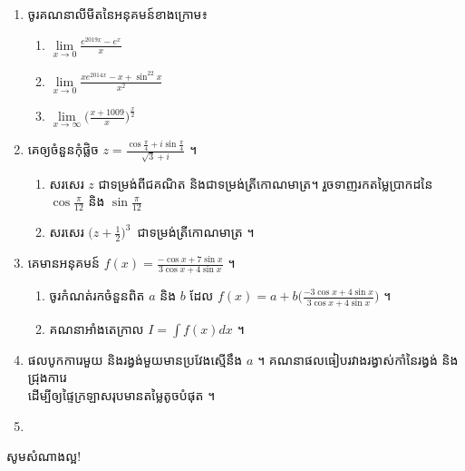 \documentclass[a4paper, 12pt]{exam}
\begin{document}
	\begin{enumerate}[I]
		\item ចូរគណនាលីមីតនៃអនុគមន៍ខាងក្រោម៖
		\begin{multicols}{3}
			\begin{enumerate}[a]
				\item $\lim\limits_{x\to 0}\frac{e^{2019x}-e^x}{x}$
				\item $\lim\limits_{x\to 0}\frac{xe^{2014x}-x+\sin^22x}{x^2}$
				\item $\lim\limits_{x\to\infty}\bigg(\frac{x+1009}{x}\bigg)^\frac{x}{2}$
			\end{enumerate}
		\end{multicols}
		\item គេឲ្យចំនួនកុំផ្លិច $z=\frac{\cos\frac{\pi}{4}+i\sin\frac{\pi}{4}}{\sqrt{3}+i}$ ។
		\begin{enumerate}[1]
			\item សរសេរ $z$ ជាទម្រង់ពីជគណិត និងជាទម្រង់ត្រីកោណមាត្រ។ រួចទាញរកតម្លៃប្រាកដនៃ $\cos\frac{\pi}{12}$ និង $\sin\frac{\pi}{12}$
			\item សរសេរ $\bigg(z+\frac{1}{2}\bigg)^3$~ជាទម្រង់ត្រីកោណមាត្រ ។
		\end{enumerate}
		\item គេមានអនុគមន៍ $f(x)=\frac{-\cos x+7\sin x}{3\cos x+4\sin x}$ ។
		\begin{enumerate}[1]
			\item ចូរកំណត់រកចំនួនពិត $a$ និង $b$ ដែល $f(x)=a+b\bigg(\frac{-3\cos x+4\sin x}{3\cos x+4\sin x}\bigg)$ ។
			\item គណនាអាំងតេក្រាល $I=\int f(x) dx$ ។
		\end{enumerate}
		\item ផលបូកការេមួយ និងរង្វង់មួយមានប្រវែងស្មើនឹង $a$ ។ គណនាផលធៀបរវាងរង្វាស់កាំនៃរង្វង់ និងជ្រុងការេ\\ ដើម្បីឲ្យផ្ទៃក្រឡាសរុបមានតម្លៃតូចបំផុត ។
		\item 
	\end{enumerate}
\begin{center}
	\sffamily\color{black}
	សូមសំណាងល្អ!
\end{center}\newpage
\end{document}

